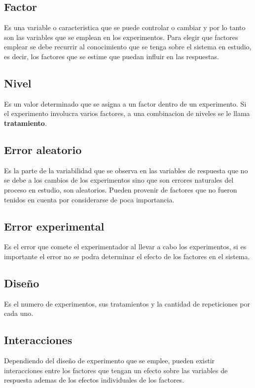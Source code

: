 \documentclass[a4paper]{article}
\begin{document}
\subsection*{Factor}
Es una variable o caracteristica que se puede controlar o cambiar y por lo tanto son las variables que se emplean 
en los experimentos. Para elegir que factores emplear se debe recurrir al conocimiento que se tenga sobre el 
sistema en estudio, es decir, los factores que se estime que puedan influir en las respuestas.

\subsection*{Nivel}
Es un valor determinado que se asigna a un factor dentro de un experimento. Si el experimento involucra varios factores,
a una combinacion de niveles se le llama \textbf{tratamiento}.

\subsection*{Error aleatorio}
Es la parte de la variabilidad que se observa en las variables de respuesta que no se debe a los cambios de los 
experimentos sino que son errores naturales del proceso en estudio, son aleatorios. Pueden provenir de factores
que no fueron tenidos en cuenta por considerarse de poca importancia.

\subsection*{Error experimental}
Es el error que comete el experimentador al llevar a cabo los experimentos, si es importante el error no se podra
determinar el efecto de los factores en el sistema.

\subsection*{Diseño}
Es el numero de experimentos, sus tratamientos y la cantidad de repeticiones por cada uno.

\subsection*{Interacciones}
Dependiendo del diseño de experimento que se emplee, pueden existir interacciones entre los factores que tengan 
un efecto sobre las variables de respuesta ademas de los efectos individuales de los factores.
\end{document}
